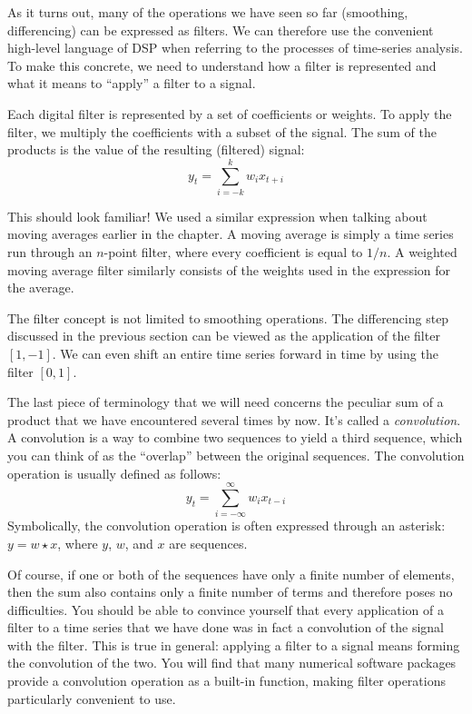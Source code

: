 As it turns out, many of the operations we have seen so far
(smoothing, differencing) can be expressed as filters. We can
therefore use the convenient high-level language of DSP when
referring to the processes of time-series analysis. To make this
concrete, we need to understand how a filter is represented and what
it means to ``apply'' a filter to a signal.

Each digital filter is represented by a set of coefficients or
weights. To apply the filter, we multiply the coefficients with a subset
of the signal. The sum of the products is the value of the resulting
(filtered) signal:
%
\[
y_t = \sum_{i=-k}^k w_i x_{t+i}
\]
%
\clearpage

\noindent
This should look familiar! We used a similar expression when talking
about moving averages earlier in the chapter. A moving average is
simply a time series run through an $n$-point filter, where every
coefficient is equal to $1/n$. A weighted moving average filter
similarly consists of the weights used in the expression for the
average.

The filter concept is not limited to smoothing operations. The
differencing step discussed in the previous section can be viewed as
the application of the filter $[1, -1]$. We can even shift an entire
time series forward in time by using the filter $[0, 1]$.

The last piece of terminology that we will need concerns the peculiar
sum of a product that we have encountered several times by now.  It's
called a \emph{convolution}. A convolution is a way to combine two
sequences to yield a third sequence, which you can think of as
the ``overlap'' between the original sequences. The convolution
operation is usually defined as follows:
%
\[
y_t = \sum_{i=-\infty}^\infty w_i x_{t-i}
\]
%
Symbolically, the convolution operation is often expressed through an
asterisk: $y = w \star x$, where $y$, $w$, and $x$ are sequences.

Of course, if one or both of the sequences have only a finite number
of elements, then the sum also contains only a finite number of terms
and therefore poses no difficulties. You should be able to convince
yourself that every application of a filter to a time series that we
have done was in fact a convolution of the signal with the filter.
This is true in general: applying a filter to a signal means forming
the convolution of the two. You will find that many numerical software
packages provide a convolution operation as a built-in function,
making filter operations particularly convenient to use.

